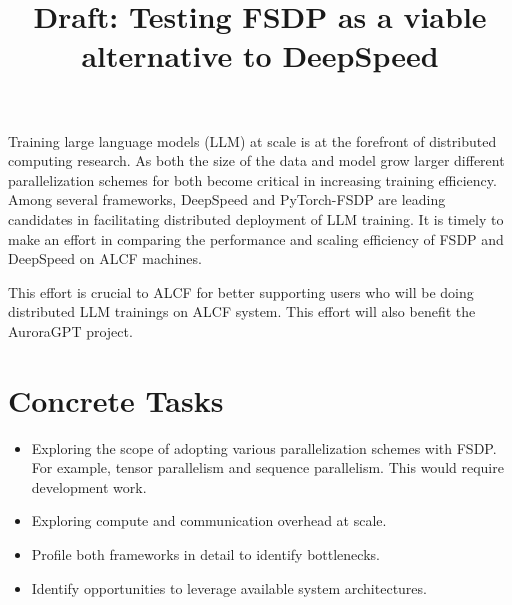 \documentclass{article}
\title{Draft: Testing FSDP as a viable alternative to DeepSpeed}
\author{}
\begin{document}
\maketitle

Training large language models (LLM) at scale is at the forefront of 
distributed computing research. As both the size of the data and model grow 
larger different parallelization schemes for both become critical in increasing
training efficiency. Among several frameworks, DeepSpeed and PyTorch-FSDP are
leading candidates in facilitating distributed deployment of LLM training. It 
is timely to make an effort in comparing the performance and scaling efficiency
of FSDP and DeepSpeed on ALCF machines.

This effort is crucial to ALCF for better supporting users who will be doing 
distributed LLM trainings on ALCF system. This effort will also benefit the 
AuroraGPT project. 

\section*{Concrete Tasks}
\begin{itemize}
    \item Exploring the scope of adopting various parallelization schemes with
        FSDP. For example, tensor parallelism and sequence parallelism. This 
        would require development work.
    \item Exploring compute and communication overhead at scale.
    \item Profile both frameworks in detail to identify bottlenecks.
    \item Identify opportunities to leverage available system architectures.
\end{itemize}
\end{document}
